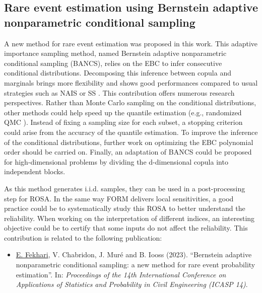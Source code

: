 \subsection*{Rare event estimation using Bernstein adaptive nonparametric conditional sampling}

A new method for rare event estimation was proposed in this work. 
This adaptive importance sampling method, named Bernstein adaptive nonparametric conditional sampling (BANCS), relies on the EBC to infer consecutive conditional distributions. 
Decomposing this inference between copula and marginals brings more flexibility and shows good performances compared to usual strategies such as NAIS \citep{zhang_1996_NIS} or SS \citep{AuBeck2001}. 
This contribution offers numerous research perspectives. 
Rather than Monte Carlo sampling on the conditional distributions, other methods could help speed up the quantile estimation (e.g., randomized QMC \citealp{tuffin_2019}). 
Instead of fixing a sampling size for each subset, a stopping criterion could arise from the accuracy of the quantile estimation. 
To improve the inference of the conditional distributions, further work on optimizing the EBC polynomial order should be carried on. 
Finally, an adaptation of BANCS could be proposed for high-dimensional problems by dividing the d-dimensional copula into independent blocks.   

As this method generates i.i.d. samples, they can be used in a post-processing step for ROSA.
In the same way FORM delivers local sensitivities, a good practice could be to systematically study this ROSA to better understand the reliability. 
When working on the interpretation of different indices, an interesting objective could be to certify that some inputs do not affect the reliability. 
This contribution is related to the following publication:
\begin{itemize}
    \footnotesize
    \item[\ding{125}] \underline{E. Fekhari}, V. Chabridon, J. Muré and B. Iooss (2023). ``Bernstein adaptive nonparametric conditional sampling: a new method for rare event probability estimation''. In: \textit{Proceedings of the 14th International Conference on Applications of Statistics and Probability in Civil Engineering (ICASP 14)}.
\end{itemize}




